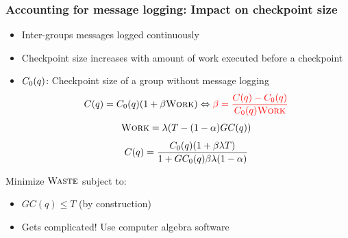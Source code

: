 \begin{frame}
  \frametitle{Accounting for message logging: Impact on checkpoint size}

 \begin{itemize}
 \item Inter-groups messages logged continuously
 \item  Checkpoint size increases with amount of work executed before a checkpoint
 \item $C_0(q)$: Checkpoint size of a group without message logging
$$
\cgroup = \cgroupbase (1 + \amountlog \Work) \Leftrightarrow \color{red}{\amountlog = \frac{\cgroup - \cgroupbase}{\cgroupbase \Work}}
$$
$$\textsc{Work} = \lambda (T - (1-\alpha)GC(q))$$
$$C(q) = \frac{ C_0(q) (1 + \beta \lambda T)}{1+ G C_0(q) \beta \lambda (1-\alpha)}$$


 \end{itemize}

 \vfill
 Minimize $\textsc{Waste}$ subject to:
  \begin{itemize}
  \item $G C(q) \leq T$ (by construction)
  \item Gets complicated! Use computer algebra software \frownie
  \end{itemize}
\end{frame}

